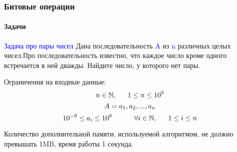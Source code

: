\documentclass[aspectratio=169]{beamer}
\begin{document}
\begin{frame}
\frametitle{Битовые операции}
\framesubtitle{Задачи}
\justifying
\small

\textcolor{blue}{Задача про пары чисел}\newline
Дана последовательность \textcolor{blue}{A} из \textcolor{blue}{n} различных целых чисел.\newline Про последовательность известно, что каждое число кроме одного встречается в ней дважды. Найдите число, у которого нет пары.\newline

Ограничения на входные данные:\newline
$$\LARGE n \in \mathbb{N}, \quad 1 \leq n \leq 10^{9}$$
$$\LARGE A = a_{1}, a_{2}, ... , a_{n}$$
$$\LARGE 10^{-9}\leq a_i \leq 10^{9} \quad\quad \forall i \in \mathbb{N},\quad 1 \leq i \leq n$$

Количество дополнительной памяти, используемой алгоритмом, не должно превышать 1MB, время работы 1 секунда.

\end{frame}
\end{document}
